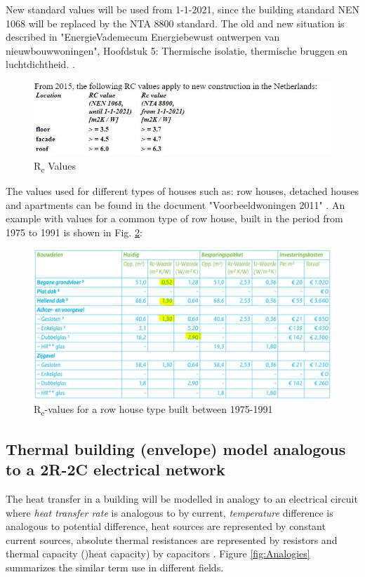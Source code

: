 New standard values will be used from 1-1-2021, since the building standard NEN 1068 will be replaced by the NTA 8800 standard. The old and new situation is described in "EnergieVademecum Energiebewust ontwerpen van nieuwbouwwoningen", Hoofdstuk 5: Thermische isolatie, thermische bruggen en luchtdichtheid.
\cite{ISSO}.

\begin{figure}[H]
	\centering
	\includegraphics[width=0.8\columnwidth]{Pictures/Rc_values_2021.JPG}
	\caption[Short title]{R\textsubscript{c} Values \cite{RVALUE}}
	\label{fig:newRc}
\end{figure}

The values used for different types of houses such as: row houses, detached houses and apartments can be found in the document "Voorbeeldwoningen 2011" \cite{VOORBEELD}. An example with values for a common type of row house, built in the period from 1975 to 1991 is shown in Fig. \ref{row_house}:


\begin{figure}[H]
	\centering
	\includegraphics[width=0.8\columnwidth]{Pictures/row_house_1975-1991.JPG}
	\caption[Short title]{R\textsubscript{c}-values for a row house type built between 1975-1991 \cite{VOORBEELD}}
	\label{row_house}
\end{figure} 

\subsection{Thermal building (envelope) model analogous to a 2R-2C electrical network}

The heat transfer in a building will be modelled in analogy to an electrical circuit where \emph{heat transfer rate} is analogous to by current, \emph{temperature} difference is analogous to potential difference, heat sources are represented by constant current sources, absolute thermal resistances are represented by resistors and thermal capacity ()heat capacity) by capacitors \cite{AbsTR}. Figure \ref{fig:Analogies} summarizes the similar term use in different fields.

